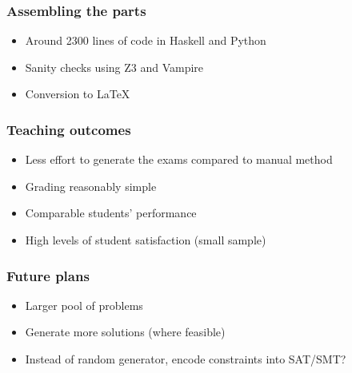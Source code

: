 \documentclass[xcolor={table}]{beamer}
\begin{document}


\begin{frame}
\frametitle{Assembling the parts}
\begin{itemize}
\item Around 2300 lines of code in Haskell and Python
\item Sanity checks using Z3 and Vampire
\item Conversion to \LaTeX
\end{itemize}
\end{frame}



\begin{frame}
\frametitle{Teaching outcomes}
\begin{itemize}
\item Less effort to generate the exams compared to manual method
\item Grading reasonably simple
\item Comparable students' performance
\item High levels of student satisfaction (small sample)
\end{itemize}
\end{frame}



\begin{frame}
\frametitle{Future plans}
\begin{itemize}
    \item Larger pool of problems
    \item Generate more solutions (where feasible)
    \item Instead of random generator, encode constraints into SAT/SMT?
\end{itemize}
\end{frame}


\end{document}
